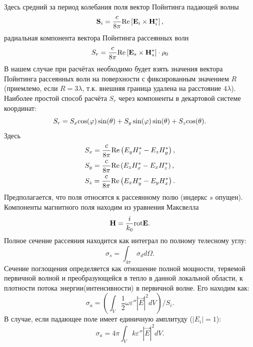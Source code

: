 Здесь средний за период колебания поля вектор Пойнтинга падающей волны
\begin{equation}
{\vec S}_i = \dfrac{c}{8\pi} {\rm Re} \left[{\vec E}_i \times {\vec H}^*_i\right],
\end{equation}
радиальная компонента вектора Пойнтинга рассеянных волн
\begin{equation}
{S}_r = \dfrac{c}{8\pi} {\rm Re} \left[{\vec E}_s \times {\vec H}^*_s\right] \cdot {\vec \rho}_0
\end{equation}
В нашем случае при расчётах необходимо будет взять значения вектора Пойнтинга рассеянных волн на поверхности с фиксированным значением $R$ (приемлемо, если $R=3\lambda$, т.к. внешняя граница удалена на расстояние $4\lambda$).\\
Наиболее простой способ расчёта $S_r$ через компоненты в декартовой системе координат:
\begin{equation}
{S}_r = S_x {\rm cos}(\varphi)\sin(\theta) + S_y \sin(\varphi)\sin(\theta) + S_z {\rm cos}(\theta).
\end{equation}
Здесь
\begin{eqnarray}
& S_x = \dfrac{c}{8\pi} {\rm Re} \left(E_y H_z^* - E_z H_y^*\right),\nonumber\\
& S_y = \dfrac{c}{8\pi} {\rm Re} \left(E_z H_x^* - E_x H_z^*\right),\nonumber\\ & S_z = \dfrac{c}{8\pi} {\rm Re} \left(E_x H_y^* - E_y H_x^*\right).
\end{eqnarray}
Предполагается, что поля относятся к рассеянному полю (индеркс $s$ опущен).
Компоненты магнитного поля находим из уравнения Максвелла
\begin{equation}
{\vec H} = \dfrac{i}{k_0} {\rm \rm rot} \vec{E}.
\end{equation}
Полное сечение рассеяния находится как интеграл по полному телесному углу:
\begin{equation}
\sigma_s = \int_{4\pi} \sigma_d d\Omega.
\end{equation}
Сечение поглощения определяется как отношение полной мощности, теряемой первичной волной и преобразующейся в тепло в данной локальной области, к плотности потока энергии(интенсивности) в первичной волне. Его находим как:
\begin{equation}
\sigma_a = \left(\int_V \dfrac{1}{2}\omega\varepsilon''|{\vec E}|^2 d V\right)/S_i.
\end{equation}
В случае, если падающее поле имеет единичную амплитуду ($|E_i|=1$):
\begin{equation}
\sigma_a = 4\pi \int_V k \varepsilon''|{\vec E}|^2 d V.
\end{equation}
